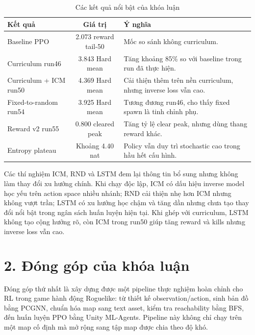 \begin{table}[H]
    \centering
    \small
    \caption{Các kết quả nổi bật của khóa luận}
    \label{tab:conclusion_best_results}
    \begin{tabular}{|p{4.5cm}|c|p{7cm}|}
        \hline
        \textbf{Kết quả} & \textbf{Giá trị} & \textbf{Ý nghĩa} \\
        \hline
        Baseline PPO & 2.073 reward tail-50 & Mốc so sánh không curriculum. \\
        \hline
        Curriculum run46 & 3.843 Hard mean & Tăng khoảng 85\% so với baseline trong run đã thực hiện. \\
        \hline
        Curriculum + ICM run50 & 4.369 Hard mean & Cải thiện thêm trên nền curriculum, nhưng inverse loss vẫn cao. \\
        \hline
        Fixed-to-random run54 & 3.925 Hard mean & Tương đương run46, cho thấy fixed spawn là tinh chỉnh phụ. \\
        \hline
        Reward v2 run55 & 0.800 cleared peak & Tăng tỷ lệ clear peak, nhưng dùng thang reward khác. \\
        \hline
        Entropy plateau & Khoảng 4.40 nat & Policy vẫn duy trì stochastic cao trong hầu hết cấu hình. \\
        \hline
    \end{tabular}
\end{table}

Các thí nghiệm ICM, RND và LSTM đem lại thông tin bổ sung nhưng không làm thay đổi xu hướng chính. Khi chạy độc lập, ICM có dấu hiệu inverse model học yếu trên action space nhiều nhánh; RND cải thiện nhẹ hơn ICM nhưng không vượt trần; LSTM có xu hướng học chậm và tăng dần nhưng chưa tạo thay đổi nổi bật trong ngân sách huấn luyện hiện tại. Khi ghép với curriculum, LSTM không tạo cộng hưởng rõ, còn ICM trong run50 giúp tăng reward và kills nhưng inverse loss vẫn cao.

\section*{2. Đóng góp của khóa luận}

Đóng góp thứ nhất là xây dựng được một pipeline thực nghiệm hoàn chỉnh cho RL trong game hành động Roguelike: từ thiết kế observation/action, sinh bản đồ bằng PCGNN, chuẩn hóa map sang text asset, kiểm tra reachability bằng BFS, đến huấn luyện PPO bằng Unity ML-Agents. Pipeline này không chỉ chạy trên một map cố định mà mở rộng sang tập map được chia theo độ khó.

